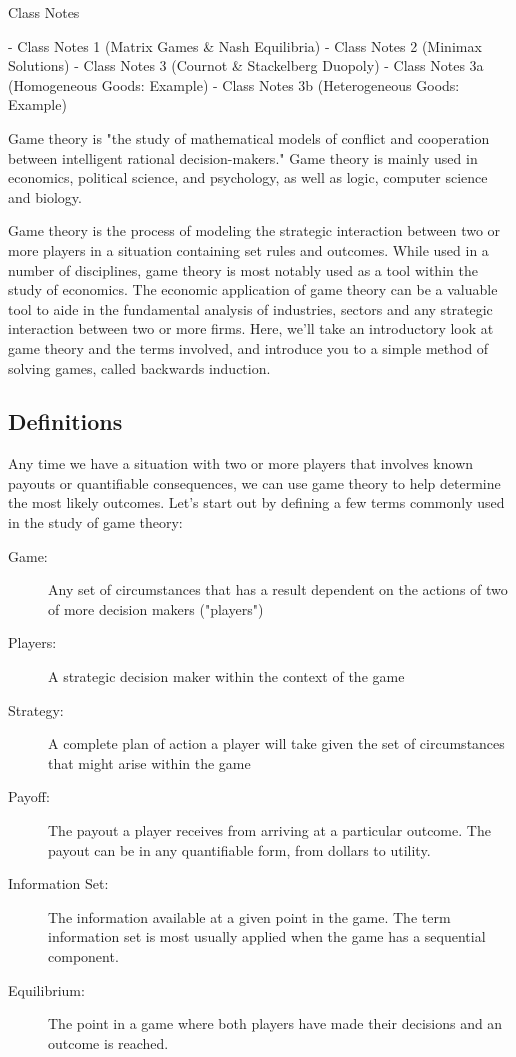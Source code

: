 

Class Notes

- Class Notes 1 (Matrix Games & Nash Equilibria)
- Class Notes 2 (Minimax Solutions)
- Class Notes 3 (Cournot & Stackelberg Duopoly)
- Class Notes 3a (Homogeneous Goods: Example)
- Class Notes 3b (Heterogeneous Goods: Example)





Game theory is "the study of mathematical models of conflict and cooperation between intelligent rational decision-makers." Game theory is mainly used in economics, political science, and psychology, as well as logic, computer science and biology.



Game theory is the process of modeling the strategic interaction between two or more players in a situation containing set rules and outcomes. While used in a number of disciplines, game theory is most notably used as a tool within the study of economics. The economic application of game theory can be a valuable tool to aide in the fundamental analysis of industries, sectors and any strategic interaction between two or more firms. Here, we'll take an introductory look at game theory and the terms involved, and introduce you to a simple method of solving games, called backwards induction.

\subsection{Definitions} 
Any time we have a situation with two or more players that involves known payouts or quantifiable consequences, we can use game theory to help determine the most likely outcomes. 
Let's start out by defining a few terms commonly used in the study of game theory:

\begin{description}
\item[Game:] Any set of circumstances that has a result dependent on the actions of two of more decision makers ("players")
\item[Players:] A strategic decision maker within the context of the game
\item[Strategy:] A complete plan of action a player will take given the set of circumstances that might arise within the game
\item[Payoff:] The payout a player receives from arriving at a particular outcome. The payout can be in any quantifiable form, from dollars to utility.
\item[Information Set:] The information available at a given point in the game. The term information set is most usually applied when the game has a sequential component.
\item[Equilibrium:] The point in a game where both players have made their decisions and an outcome is reached.
\end{description}

